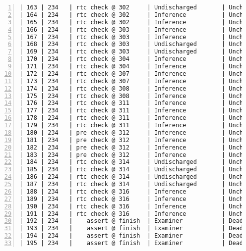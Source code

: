\begin{lstlisting}[gobble=0, numbers=left, caption={POGS report for PCA Pump prototype}, label={listing:pca_ravenscar:pogs_full}]
| 163 | 234   | rtc check @ 302     | Undischarged       | Unchecked |   UU   |
| 164 | 234   | rtc check @ 302     | Inference          | Unchecked |   IU   |
| 165 | 234   | rtc check @ 302     | Inference          | Unchecked |   IU   |
| 166 | 234   | rtc check @ 303     | Inference          | Unchecked |   IU   |
| 167 | 234   | rtc check @ 303     | Inference          | Unchecked |   IU   |
| 168 | 234   | rtc check @ 303     | Undischarged       | Unchecked |   UU   |
| 169 | 234   | rtc check @ 303     | Undischarged       | Unchecked |   UU   |
| 170 | 234   | rtc check @ 304     | Inference          | Unchecked |   IU   |
| 171 | 234   | rtc check @ 304     | Inference          | Unchecked |   IU   |
| 172 | 234   | rtc check @ 307     | Inference          | Unchecked |   IU   |
| 173 | 234   | rtc check @ 307     | Inference          | Unchecked |   IU   |
| 174 | 234   | rtc check @ 308     | Inference          | Unchecked |   IU   |
| 175 | 234   | rtc check @ 308     | Inference          | Unchecked |   IU   |
| 176 | 234   | rtc check @ 311     | Inference          | Unchecked |   IU   |
| 177 | 234   | rtc check @ 311     | Inference          | Unchecked |   IU   |
| 178 | 234   | rtc check @ 311     | Inference          | Unchecked |   IU   |
| 179 | 234   | rtc check @ 311     | Inference          | Unchecked |   IU   |
| 180 | 234   | pre check @ 312     | Inference          | Unchecked |   IU   |
| 181 | 234   | pre check @ 312     | Inference          | Unchecked |   IU   |
| 182 | 234   | pre check @ 312     | Inference          | Unchecked |   IU   |
| 183 | 234   | pre check @ 312     | Inference          | Unchecked |   IU   |
| 184 | 234   | rtc check @ 314     | Undischarged       | Unchecked |   UU   |
| 185 | 234   | rtc check @ 314     | Undischarged       | Unchecked |   UU   |
| 186 | 234   | rtc check @ 314     | Undischarged       | Unchecked |   UU   |
| 187 | 234   | rtc check @ 314     | Undischarged       | Unchecked |   UU   |
| 188 | 234   | rtc check @ 316     | Inference          | Unchecked |   IU   |
| 189 | 234   | rtc check @ 316     | Inference          | Unchecked |   IU   |
| 190 | 234   | rtc check @ 316     | Inference          | Unchecked |   IU   |
| 191 | 234   | rtc check @ 316     | Inference          | Unchecked |   IU   |
| 192 | 234   |    assert @ finish  | Examiner           | Dead      |   ED   |
| 193 | 234   |    assert @ finish  | Examiner           | Dead      |   ED   |
| 194 | 234   |    assert @ finish  | Examiner           | Dead      |   ED   |
| 195 | 234   |    assert @ finish  | Examiner           | Dead      |   ED   |

\end{lstlisting}

